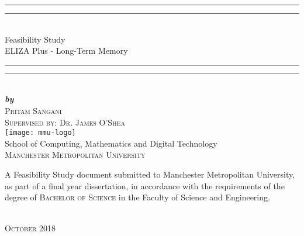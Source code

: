 %
%
\watermarkoff
\begin{large}
\begin{titlepage}
\vspace*{10mm}
\begin{center}
	\rule[0.5ex]{\linewidth}{1.5pt}\vspace*{-\baselineskip}\vspace*{3.3pt}
	\rule[0.5ex]{\linewidth}{1pt}\\[\baselineskip]
	{\Huge Feasibility Study}\\[4mm]
	{\LARGE {ELIZA Plus - Long-Term Memory}}
	\rule[0.5ex]{\linewidth}{1pt}\vspace*{-\baselineskip}\vspace*{3.3pt}
	\rule[0.5ex]{\linewidth}{1.5pt}\\[\baselineskip]
	\vspace{6.5mm}
	{\Large\textit{\textbf{by}}}\\
	\vspace{6.5mm}
	{\Large\textsc{Pritam Sangani}}\\
	\vspace{6.5mm}
	{\Large\textsc{Supervised by: Dr. James O'Shea}}\\
	\vspace{11mm}
	\texttt{[image: mmu-logo]}\\
	\vspace{10mm}
	{\Large School of Computing, Mathematics and Digital Technology\\
	\textsc{Manchester Metropolitan University}}\\
	\vspace{15mm}
	\begin{minipage}{10cm}
		\begin{center}
			
			{\large A Feasibility Study document submitted to Manchester Metropolitan University, as part of a final year dissertation, in accordance with the requirements of the degree of \textsc{Bachelor of Science} in the Faculty of Science and Engineering.}
		\end{center}
	\end{minipage}\\
	\vspace{15mm}
	{\Large\textsc{October 2018}}
	\vspace{12mm}
\end{center}
\end{titlepage}
\end{large}